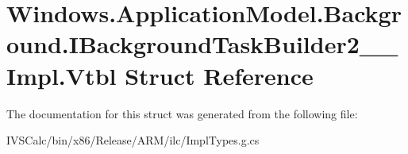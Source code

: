 \hypertarget{struct_windows_1_1_application_model_1_1_background_1_1_i_background_task_builder2_____impl_1_1_vtbl}{}\section{Windows.\+Application\+Model.\+Background.\+I\+Background\+Task\+Builder2\+\_\+\+\_\+\+Impl.\+Vtbl Struct Reference}
\label{struct_windows_1_1_application_model_1_1_background_1_1_i_background_task_builder2_____impl_1_1_vtbl}


The documentation for this struct was generated from the following file\+:\begin{DoxyCompactItemize}
\item 
I\+V\+S\+Calc/bin/x86/\+Release/\+A\+R\+M/ilc/Impl\+Types.\+g.\+cs\end{DoxyCompactItemize}
